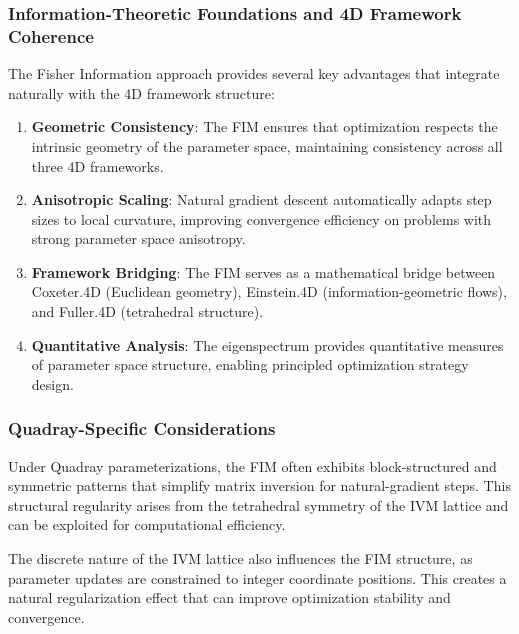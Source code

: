 \documentclass[
  10pt,
]{article}
\begin{document}
\hypertarget{information-theoretic-foundations-and-4d-framework-coherence}{%
\subsubsection{Information-Theoretic Foundations and 4D Framework
Coherence}\label{information-theoretic-foundations-and-4d-framework-coherence}}

The Fisher Information approach provides several key advantages that
integrate naturally with the 4D framework structure:

\begin{enumerate}
\def\labelenumi{\arabic{enumi}.}
\item
  \textbf{Geometric Consistency}: The FIM ensures that optimization
  respects the intrinsic geometry of the parameter space, maintaining
  consistency across all three 4D frameworks.
\item
  \textbf{Anisotropic Scaling}: Natural gradient descent automatically
  adapts step sizes to local curvature, improving convergence efficiency
  on problems with strong parameter space anisotropy.
\item
  \textbf{Framework Bridging}: The FIM serves as a mathematical bridge
  between Coxeter.4D (Euclidean geometry), Einstein.4D
  (information-geometric flows), and Fuller.4D (tetrahedral structure).
\item
  \textbf{Quantitative Analysis}: The eigenspectrum provides
  quantitative measures of parameter space structure, enabling
  principled optimization strategy design.
\end{enumerate}

\hypertarget{quadray-specific-considerations}{%
\subsubsection{Quadray-Specific
Considerations}\label{quadray-specific-considerations}}

Under Quadray parameterizations, the FIM often exhibits block-structured
and symmetric patterns that simplify matrix inversion for
natural-gradient steps. This structural regularity arises from the
tetrahedral symmetry of the IVM lattice and can be exploited for
computational efficiency.

The discrete nature of the IVM lattice also influences the FIM
structure, as parameter updates are constrained to integer coordinate
positions. This creates a natural regularization effect that can improve
optimization stability and convergence.
\end{document}
